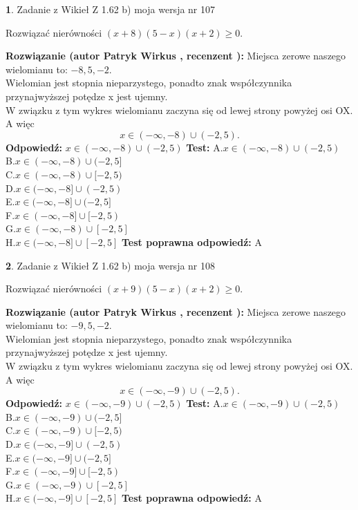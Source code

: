\documentclass[12pt, a4paper]{article}
\theoremstyle{definition} %
\newtheorem{zad}{}
\newcommand{\zadStart}[1]{\begin{zad}#1\newline}
\newcommand{\zadStop}{\end{zad}}
\newcommand{\rozwStart}[2]{\noindent \textbf{Rozwiązanie (autor #1 , recenzent #2): }\newline}
\newcommand{\rozwStop}{\newline}
\newcommand{\odpStart}{\noindent \textbf{Odpowiedź:}\newline}
\newcommand{\odpStop}{\newline}
\newcommand{\testStart}{\noindent \textbf{Test:}\newline}
\newcommand{\testStop}{\newline}
\newcommand{\kluczStart}{\noindent \textbf{Test poprawna odpowiedź:}\newline}
\newcommand{\kluczStop}{\newline}
\begin{document}
\zadStart{Zadanie z Wikieł Z 1.62 b) moja wersja nr 107}

Rozwiązać nierówności $(x+8)(5-x)(x+2)\ge0$.
\zadStop
\rozwStart{Patryk Wirkus}{}
Miejsca zerowe naszego wielomianu to: $-8, 5, -2$.\\
Wielomian jest stopnia nieparzystego, ponadto znak współczynnika przy\linebreak najwyższej potędze x jest ujemny.\\ W związku z tym wykres wielomianu zaczyna się od lewej strony powyżej osi OX. A więc $$x \in (-\infty,-8) \cup (-2,5).$$
\rozwStop
\odpStart
$x \in (-\infty,-8) \cup (-2,5)$
\odpStop
\testStart
A.$x \in (-\infty,-8) \cup (-2,5)$\\
B.$x \in (-\infty,-8) \cup (-2,5]$\\
C.$x \in (-\infty,-8) \cup [-2,5)$\\
D.$x \in (-\infty,-8] \cup (-2,5)$\\
E.$x \in (-\infty,-8] \cup (-2,5]$\\
F.$x \in (-\infty,-8] \cup [-2,5)$\\
G.$x \in (-\infty,-8) \cup [-2,5]$\\
H.$x \in (-\infty,-8] \cup [-2,5]$
\testStop
\kluczStart
A
\kluczStop



\zadStart{Zadanie z Wikieł Z 1.62 b) moja wersja nr 108}

Rozwiązać nierówności $(x+9)(5-x)(x+2)\ge0$.
\zadStop
\rozwStart{Patryk Wirkus}{}
Miejsca zerowe naszego wielomianu to: $-9, 5, -2$.\\
Wielomian jest stopnia nieparzystego, ponadto znak współczynnika przy\linebreak najwyższej potędze x jest ujemny.\\ W związku z tym wykres wielomianu zaczyna się od lewej strony powyżej osi OX. A więc $$x \in (-\infty,-9) \cup (-2,5).$$
\rozwStop
\odpStart
$x \in (-\infty,-9) \cup (-2,5)$
\odpStop
\testStart
A.$x \in (-\infty,-9) \cup (-2,5)$\\
B.$x \in (-\infty,-9) \cup (-2,5]$\\
C.$x \in (-\infty,-9) \cup [-2,5)$\\
D.$x \in (-\infty,-9] \cup (-2,5)$\\
E.$x \in (-\infty,-9] \cup (-2,5]$\\
F.$x \in (-\infty,-9] \cup [-2,5)$\\
G.$x \in (-\infty,-9) \cup [-2,5]$\\
H.$x \in (-\infty,-9] \cup [-2,5]$
\testStop
\kluczStart
A
\kluczStop
\end{document}
